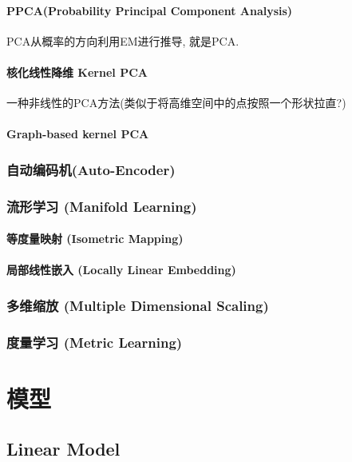 \documentclass[oneside]{book}
\begin{document}
					\subsubsection{PPCA(Probability Principal Component Analysis) \NovaMonoFont{[Linear]}}
					PCA从概率的方向利用EM进行推导, 就是PCA. 
					\subsubsection{核化线性降维 Kernel PCA \NovaMonoFont{[Nonlinear]}}
					一种非线性的PCA方法(类似于将高维空间中的点按照一个形状拉直?)
					\subsubsection{Graph-based kernel PCA \NovaMonoFont{[Nonlinear]}}
					
				
				\subsection{自动编码机(Auto-Encoder)}
				\subsection{流形学习 (Manifold Learning) }
					\subsubsection{等度量映射 (Isometric Mapping)  \NovaMonoFont{[Nonlinear]}}
					\subsubsection{局部线性嵌入 (Locally Linear Embedding)  \NovaMonoFont{[Linear]}}
			\subsection{多维缩放 (Multiple Dimensional Scaling)}
			\subsection{度量学习 (Metric Learning)}
			
			
		
	\chapter{模型}
		\section{Linear Model}
\end{document}
